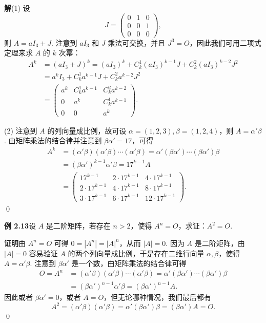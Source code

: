 \documentclass[UTF8,12pt,a4paper,fontset=fandol]{ctexart}
\begin{document}
\noindent\textbf{解}\quad (1) 设
\[
J=
\left(
\begin{array}{ccc}
0 & 1 & 0\\
0 & 0 & 1\\
0 & 0 & 0
\end{array}
\right),
\]
则 $A=aI_3+J$. 注意到 $aI_3$ 和 $J$ 乘法可交换，并且 $J^3=O$，因此我们可用二项式定理来求 $A$ 的 $k$ 次幂：
\[
\begin{aligned}
A^k
&=(aI_3+J)^k=(aI_3)^k+C_k^1(aI_3)^{k-1}J+C_k^2(aI_3)^{k-2}J^2\\
&=a^kI_3+C_k^1a^{k-1}J+C_k^2a^{k-2}J^2\\
&=
\left(
\begin{array}{ccc}
a^k & C_k^1a^{k-1} & C_k^2a^{k-2}\\
0 & a^k & C_k^1a^{k-1}\\
0 & 0 & a^k
\end{array}
\right).
\end{aligned}
\]

(2) 注意到 $A$ 的列向量成比例，故可设 $\alpha=(1,2,3),\beta=(1,2,4)$，则 $A=\alpha'\beta$. 由矩阵乘法的结合律并注意到 $\beta\alpha'=17$，可得
\[
\begin{aligned}
A^k
&=(\alpha'\beta)(\alpha'\beta)\cdots(\alpha'\beta)
=\alpha'(\beta\alpha')\cdots(\beta\alpha')\beta\\
&=(\beta\alpha')^{k-1}\alpha'\beta
=17^{k-1}A\\
&=
\left(
\begin{array}{ccc}
17^{k-1} & 2\cdot17^{k-1} & 4\cdot17^{k-1}\\
2\cdot17^{k-1} & 4\cdot17^{k-1} & 8\cdot17^{k-1}\\
3\cdot17^{k-1} & 6\cdot17^{k-1} & 12\cdot17^{k-1}
\end{array}
\right).
\end{aligned}
\]
\qed

\noindent\textbf{例 2.13}\quad 设 $A$ 是二阶矩阵，若存在 $n>2$，使得 $A^n=O$，求证：$A^2=O$.

\noindent\textbf{证明}\quad 由 $A^n=O$ 可得 $0=|A^n|=|A|^n$，从而 $|A|=0$. 因为 $A$ 是二阶矩阵，由 $|A|=0$ 容易验证 $A$ 的两个列向量成比例，于是存在二维行向量 $\alpha,\beta$，使得 $A=\alpha'\beta$. 注意到 $\beta\alpha'$ 是一个数，由矩阵乘法的结合律可得
\[
\begin{aligned}
O=A^n
&=(\alpha'\beta)(\alpha'\beta)\cdots(\alpha'\beta)
=\alpha'(\beta\alpha')\cdots(\beta\alpha')\beta\\
&=(\beta\alpha')^{n-1}\alpha'\beta
=(\beta\alpha')^{n-1}A.
\end{aligned}
\]
因此或者 $\beta\alpha'=0$，或者 $A=O$，但无论哪种情况，我们最后都有
\[
A^2=(\alpha'\beta)(\alpha'\beta)=\alpha'(\beta\alpha')\beta=(\beta\alpha')A=O.
\]
\qed
\end{document}
